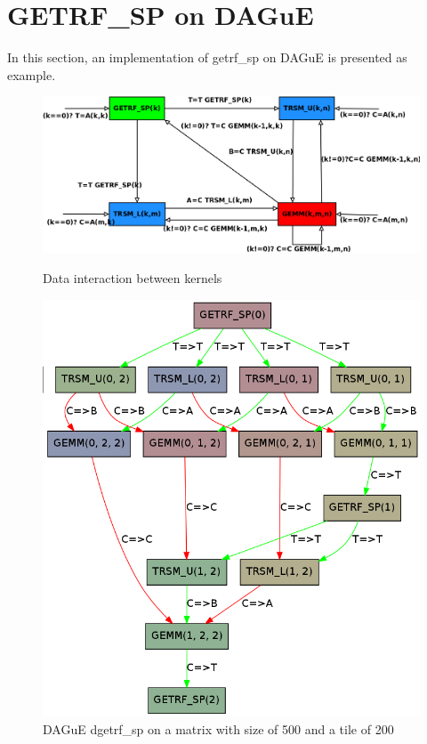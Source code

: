 \documentclass{report}
\begin{document}
\section{GETRF\_SP on DAGuE}
In this section, an implementation of getrf\_sp on DAGuE is presented as example. 

\begin{figure}[!ht]
\begin{minipage}[!ht]{.5\linewidth}
\centering
\includegraphics[width=\textwidth]{dag_getrf_sp.png}
\caption{Data interaction between kernels}
\end{minipage} \hfill
\begin{minipage}[!ht]{.5\linewidth}
\includegraphics[width=\textwidth]{dag.png}
\caption{DAGuE dgetrf\_sp on a matrix with size of 500 and a tile of 200}
\end{minipage}
\end{figure}
\end{document}
